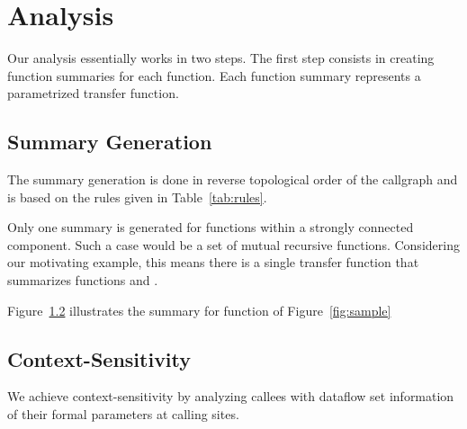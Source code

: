 \section{Analysis}\label{analysis}

Our analysis essentially works in two steps. The
first step consists in creating function summaries
for each function. Each function summary represents
a parametrized transfer function. 

\subsection{Summary Generation}

The summary
generation is done in reverse topological order of
the callgraph and is based on the rules given in
Table~\ref{tab:rules}.

Only one summary is generated for functions within
a strongly connected component. Such a case would be
a set of mutual recursive functions. Considering our
motivating example, this means there is a single transfer
function that summarizes functions \even{} and \odd{}.

Figure~\ref{} illustrates the summary for function
\main{} of Figure~\ref{fig:sample}

\subsection{Context-Sensitivity} 

We achieve context-sensitivity by analyzing callees
with dataflow set information of their formal parameters
at calling sites.

